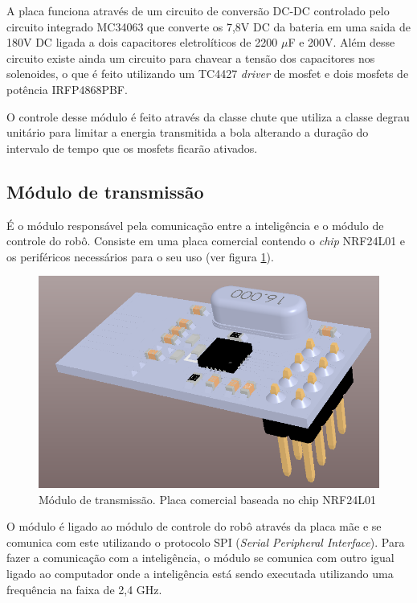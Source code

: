\documentclass[conference]{IEEEtran}
\begin{document}
A placa funciona através de um circuito de conversão DC-DC controlado pelo circuito integrado MC34063 que converte os 7,8V DC da bateria em uma saida de 180V DC ligada a dois capacitores eletrolíticos de 2200 $\mu$F e 200V. Além desse circuito existe ainda um circuito para chavear a tensão dos capacitores nos solenoides, o que é feito utilizando um TC4427 \textit{driver} de mosfet e dois mosfets de potência IRFP4868PBF. 

O controle desse módulo é feito através da classe chute que utiliza a classe degrau unitário para limitar a energia transmitida a bola alterando a duração do intervalo de tempo que os mosfets ficarão ativados.

\subsection{Módulo de transmissão}

É o módulo responsável pela comunicação entre a inteligência e o módulo de controle do robô. Consiste em uma placa comercial contendo o \textit{chip} NRF24L01 e os periféricos necessários para o seu uso (ver figura \ref{img:modulotransmissao}).
	
\begin{figure}[thpb]	
    \centering
    \includegraphics[width=0.9\linewidth]{img/modulotransmissao}
	\caption{Módulo de transmissão. Placa comercial baseada no chip NRF24L01}
	\label{img:modulotransmissao}
\end{figure}
	
O módulo é ligado ao módulo de controle do robô através da placa mãe e se comunica com este utilizando o protocolo SPI (\textit{Serial Peripheral Interface}). Para fazer a comunicação com a inteligência, o módulo se comunica com outro igual ligado ao computador onde a inteligência está sendo executada utilizando uma frequência na faixa de 2,4 GHz.
\end{document}

